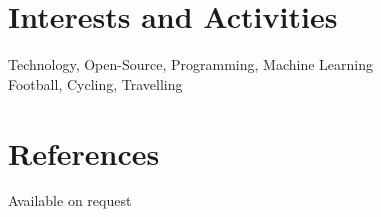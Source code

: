 \documentclass[a4paper,10pt]{article}
\begin{document}
\section{Interests and Activities}
Technology, Open-Source, Programming, Machine Learning\\
Football, Cycling, Travelling

\section{References}
Available on request
\end{document}
